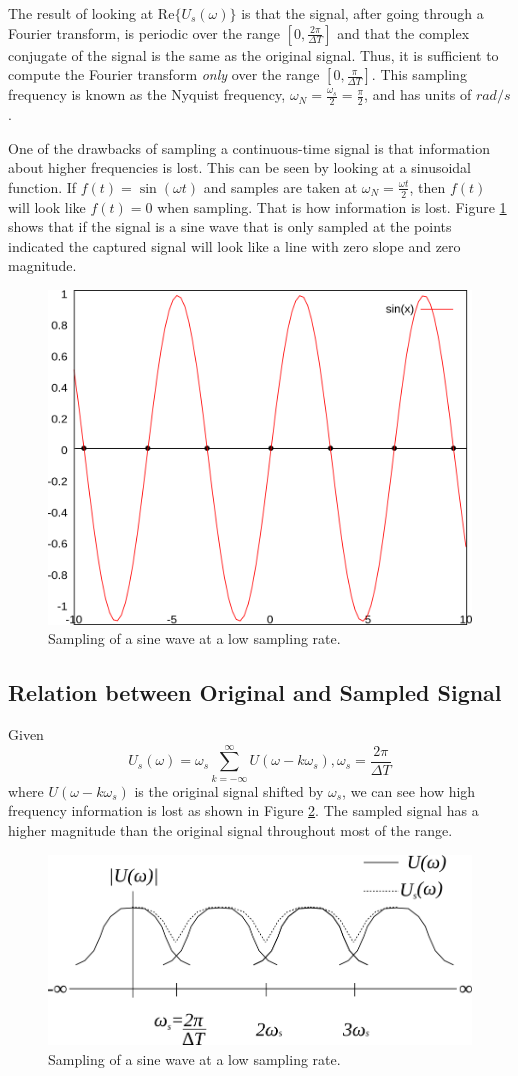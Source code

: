 \documentclass[lecture,12pt,]{pcms-l}
\theoremstyle{example}
\newcommand{\w}{\omega}
\begin{document}
The result of looking at $\text{Re}\{U_s(\w)\}$ is that the signal, after going through a Fourier transform, is periodic over the range $[0, \frac{2\pi}{\Delta T}]$ and that the complex conjugate of the signal is the same as the original signal. Thus, it is sufficient to compute the Fourier transform \textit{only} over the range $[0, \frac{\pi}{\Delta T}]$. This sampling frequency is known as the Nyquist frequency, $\w_N = \frac{\w_s}{2} = \frac{\pi}{2}$, and has units of $rad/s$.

One of the drawbacks of sampling a continuous-time signal is that information about higher frequencies is lost. This can be seen by looking at a sinusoidal function. If $f(t) = \sin(\w t)$ and samples are taken at $\w_N = \frac{\w t}{2}$, then $f(t)$ will look like $f(t) = 0$ when sampling. That is how information is lost. Figure \ref{fig:02lowSampleRate} shows that if the signal is a sine wave that is only sampled at the points indicated the captured signal will look like a line with zero slope and zero magnitude.
\begin{figure}[ht!]
	\centering
	\includegraphics[width=.3\textwidth]{images/02lowSampleRate}
	\caption{Sampling of a sine wave at a low sampling rate.}
	\label{fig:02lowSampleRate}
\end{figure}

\subsection{Relation between Original and Sampled Signal}
Given
$$U_s(\w) = \w_s \sum_{k=-\infty}^\infty U(\w-k\w_s), \w_s = \frac{2\pi}{\Delta T}$$
where $U(\w-k\w_s)$ is the original signal shifted by $\w_s$, we can see how high frequency information is lost as shown in Figure \ref{fig:02freqResp}. The sampled signal has a higher magnitude than the original signal throughout most of the range.
\begin{figure}[ht!]
	\centering
	\includegraphics[width=.4\textwidth]{images/02freqResp}
	\caption{Sampling of a sine wave at a low sampling rate.}
	\label{fig:02freqResp}
\end{figure}
\end{document}
